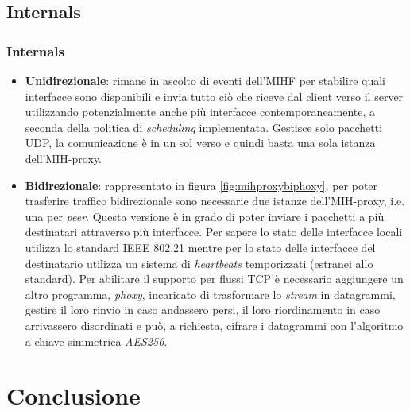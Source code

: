 \documentclass[10pt]{beamer}
\begin{document}
\subsection{Internals}
\begin{frame} %
\frametitle{Internals}
\begin{itemize}
\item \textbf{Unidirezionale}: rimane in ascolto di eventi dell'MIHF per stabilire quali interfacce sono disponibili e invia tutto ciò che riceve dal client verso il server utilizzando potenzialmente anche più interfacce contemporaneamente, a seconda della politica di {\em scheduling} implementata. Gestisce solo pacchetti UDP, la comunicazione è in un sol verso e quindi basta una sola istanza dell'MIH-proxy.
\item \textbf{Bidirezionale}: rappresentato in figura \ref{fig:mihproxybiphoxy}, per poter trasferire traffico bidirezionale sono necessarie due istanze dell'MIH-proxy, i.e. una per {\em peer}. Questa versione è in grado di poter inviare i pacchetti a più destinatari attraverso più interfacce. Per sapere lo stato delle interfacce locali utilizza lo standard IEEE 802.21 mentre per lo stato delle interfacce del destinatario utilizza un sistema di {\em heartbeats} temporizzati (estranei allo standard). Per abilitare il supporto per flussi TCP è necessario aggiungere un altro programma, {\em phoxy}, incaricato di trasformare lo {\em stream} in datagrammi, gestire il loro rinvio in caso andassero persi, il loro riordinamento in caso arrivassero disordinati e può, a richiesta, cifrare i datagrammi con l'algoritmo a chiave simmetrica {\em AES256}.
\end{itemize}
\end{frame}

\section{Conclusione}
\end{document}

